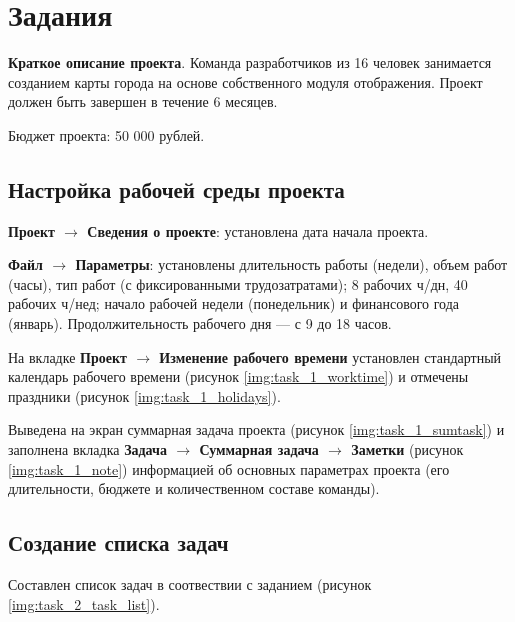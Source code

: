 \chapter{Задания}

\textbf{Краткое описание проекта}. Команда разработчиков из 16 человек занимается созданием карты
города на основе собственного модуля отображения. Проект должен быть завершен в течение
6 месяцев. 

Бюджет проекта: 50 000 рублей.

\section{Настройка рабочей среды проекта}

\textbf{Проект $ \rightarrow $ Сведения о проекте}: установлена дата начала проекта.

\textbf{Файл $ \rightarrow $ Параметры}: установлены длительность работы (недели), объем работ (часы), тип работ (с фиксированными трудозатратами); 8 рабочих ч/дн, 40 рабочих ч/нед; начало рабочей недели (понедельник) и финансового года (январь). Продолжительность рабочего дня --- с 9 до 18 часов.

\clearpage
На вкладке \textbf{Проект $ \rightarrow $ Изменение рабочего времени} установлен стандартный календарь рабочего времени 
(рисунок \ref{img:task_1_worktime}) и отмечены праздники (рисунок \ref{img:task_1_holidays}).

Выведена на экран суммарная задача проекта (рисунок \ref{img:task_1_sumtask}) и заполнена вкладка 
\textbf{Задача $ \rightarrow $ Суммарная задача $ \rightarrow $ Заметки} (рисунок \ref{img:task_1_note})
информацией об основных параметрах проекта (его длительности, бюджете и количественном составе команды).

\section{Создание списка задач}

Составлен список задач в соотвествии с заданием (рисунок \ref{img:task_2_task_list}).

